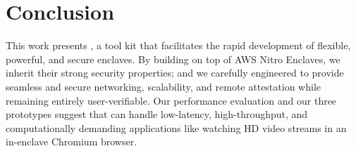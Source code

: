\section{Conclusion}%
\label{sec:conclusion}

This work presents \tool{}, a tool kit that facilitates the rapid development of
flexible, powerful, and secure enclaves.  By building \tool{} on top of AWS
Nitro Enclaves, we inherit their strong security properties; and we carefully
engineered \tool{} to provide seamless and secure networking, scalability, and
remote attestation while remaining entirely user-verifiable.
%
Our performance evaluation and our
three prototypes suggest that \tool{} can handle low-latency, high-throughput,
and computationally demanding applications like watching HD video streams in an
in-enclave Chromium browser.
